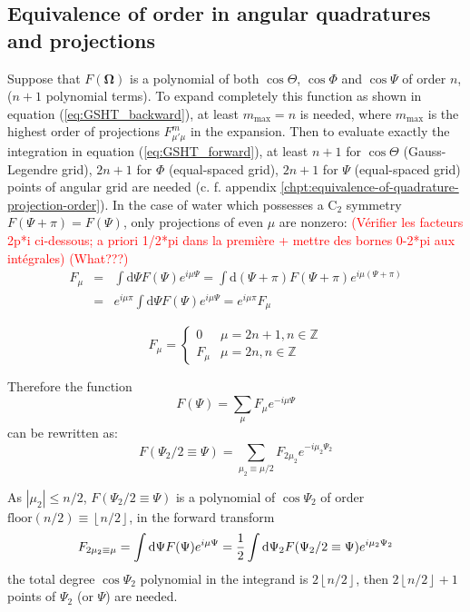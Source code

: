 \subsection{Equivalence of order in angular quadratures and projections}

Suppose that $F(\mathbf{\Omega})$ is a polynomial of both $\cos\Theta$,
$\cos\Phi$ and $\cos\Psi$ of order $n$, ($n+1$ polynomial terms).
To expand completely this function as shown in equation (\ref{eq:GSHT_backward}),
at least $m_{\mathrm{max}}=n$ is needed, where $m_{\mathrm{max}}$
is the highest order of projections $F_{\mu'\mu}^{m}$ in the expansion.
Then to evaluate exactly the integration in equation (\ref{eq:GSHT_forward}),
at least $n+1$ for $\cos\Theta$ (Gauss-Legendre grid), $2n+1$ for
$\Phi$ (equal-spaced grid), $2n+1$ for $\Psi$ (equal-spaced grid)
points of angular grid are needed (c. f. appendix \ref{chpt:equivalence-of-quadrature-projection-order}).
In the case of water which possesses a $\mathrm{C}_{2}$ symmetry
$F(\Psi+\pi)=F(\Psi)$, only projections of even $\mu$ are nonzero:
\textcolor{red}{(Vérifier les facteurs 2p{*}i ci-dessous; a priori
1/2{*}pi dans la première + mettre des bornes 0-2{*}pi aux intégrales)
(What???)}
\begin{eqnarray}
F_{\mu} & = & \int\mathrm{d}\Psi F(\Psi)e^{i\mu\Psi}=\int\mathrm{d}(\Psi+\pi)F(\Psi+\pi)e^{i\mu(\Psi+\pi)}\nonumber \\
 & = & e^{i\mu\pi}\int\mathrm{d}\Psi F(\Psi)e^{i\mu\Psi}=e^{i\mu\pi}F_{\mu}
\end{eqnarray}

\begin{equation}
F_{\mu}=\begin{cases}
0 & \mu=2n+1,n\in\mathbb{Z}\\
F_{\mu} & \mu=2n,n\in\mathbb{Z}
\end{cases}
\end{equation}

Therefore the function
\begin{equation}
F(\Psi)=\sum_{\mu}F_{\mu}e^{-i\mu\Psi}
\end{equation}
can be rewritten as:
\begin{equation}
F(\Psi_{2}/2\equiv\Psi)=\sum_{\mu_{2}\equiv\mu/2}F_{2\mu_{2}}e^{-i\mu_{2}\Psi_{2}}
\end{equation}

As $\left|\mu_{2}\right|\leq n/2$, $F(\Psi_{2}/2\equiv\Psi)$ is
a polynomial of $\cos\Psi_{2}$ of order $\mathrm{floor}(n/2)\equiv\left\lfloor n/2\right\rfloor $,
in the forward transform
\begin{equation}
F_{2\mu_{2}\equiv\mu}=\intop\mathrm{d}\Psi F(\Psi)e^{i\mu\Psi}=\frac{1}{2}\intop\mathrm{d}\Psi_{2}F(\Psi_{2}/2\equiv\Psi)e^{i\mu_{2}\Psi_{2}}
\end{equation}
the total degree $\cos\Psi_{2}$ polynomial in the integrand is $2\left\lfloor n/2\right\rfloor $,
then $2\left\lfloor n/2\right\rfloor +1$ points of $\Psi_{2}$ (or
$\Psi$) are needed. 

